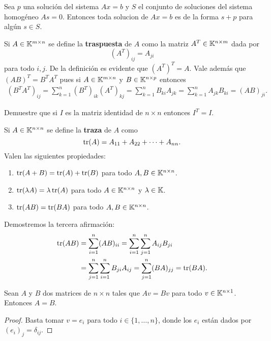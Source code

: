 \begin{xca}
	\label{xca:Ax=b_y_Ax=0}
	Sea $p$ una solución del sistema $Ax=b$ y $S$ el conjunto de soluciones del
	sistema homogéneo $As=0$. Entonces toda solucion de $Ax=b$ es de la forma
	$s+p$ para algún $s\in S$.
\end{xca}

\begin{block}
    \label{block:traspuesta}
	Si $A\in\mathbb{K}^{m\times n}$ se define la \textbf{traspuesta} de $A$ como la
	matriz $A^T\in\mathbb{K}^{n\times m}$ dada por
	\[
		(A^T)_{ij}=A_{ji}
	\]
    para todo $i,j$. De la definición es evidente que
    $(A^T)^T=A$. Vale además que $(AB)^T=B^TA^T$ pues si $A\in\mathbb{K}^{m\times n}$ y
    $B\in\mathbb{K}^{n\times p}$ entonces
	\begin{align*}
		(B^TA^T)_{ij}=\sum_{k=1}^n (B^T)_{ik}(A^T)_{kj}=\sum_{k=1}^n B_{ki}A_{jk}=\sum_{k=1}^n A_{jk}B_{ki}=(AB)_{ji}.
	\end{align*}
\end{block}

\begin{xca}
	\label{xca:I^T=I}
	Demuestre que si $I$ es la matriz identidad de $n\times n$ entonces
	$I^T=I$.
\end{xca}

\begin{block}
	Si $A\in\mathbb{K}^{n\times n}$ se define la \textbf{traza} de $A$ como
	\[
        \operatorname{tr}(A)=A_{11}+A_{22}+\cdots+A_{nn}.
    \]
	Valen las siguientes propiedades:
	\begin{enumerate}
		\item $\operatorname{tr}(A+B)=\operatorname{tr}(A)+\operatorname{tr}(B)$ para todo $A,B\in\mathbb{K}^{n\times n}$.
		\item $\operatorname{tr}(\lambda A)=\lambda\operatorname{tr}(A)$ para todo $A\in\mathbb{K}^{n\times n}$ y $\lambda\in\mathbb{K}$.
		\item $\operatorname{tr}(AB)=\operatorname{tr}(BA)$ para todo $A,B\in\mathbb{K}^{n\times n}$.
	\end{enumerate}
	Demostremos la tercera afirmación: 
	\begin{align*}
		\operatorname{tr}(AB)
		&=\sum_{i=1}^n (AB)_{ii}
		=\sum_{i=1}^n \sum_{j=1}^n A_{ij}B_{ji}\\
		&=\sum_{j=1}^n\sum_{i=1}^n B_{ji}A_{ij}
		=\sum_{j=1}^n (BA)_{jj}
		=\operatorname{tr}(BA).
	\end{align*}
\end{block}

\begin{prop}
	\label{pro:Av=Bv=>A=B}
	Sean $A$ y $B$ dos matrices de $n\times n$ tales que $Av=Bv$ para todo
	$v\in\mathbb{K}^{n\times1}$.  Entonces $A=B$.
	
	\begin{proof}
		Basta tomar $v=e_i$ para todo $i\in\{1,\dots,n\}$, donde los $e_i$
		están dados por $(e_i)_j=\delta_{ij}$.
	\end{proof}
\end{prop}

